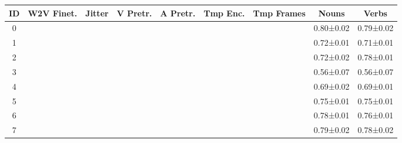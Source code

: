 \begin{tabular}{ccccccccc}
	\toprule
	ID & W2V Finet. &     Jitter &   V Pretr. &   A Pretr. &   Tmp Enc. & Tmp 
	Frames &     Nouns &     Verbs \\
	\midrule
	0 & \checkmark & \checkmark & \checkmark & \checkmark & \checkmark & 
	\checkmark & 0.80±0.02 & 0.79±0.02 \\
	1 &            & \checkmark & \checkmark & \checkmark & \checkmark & 
	\checkmark & 0.72±0.01 & 0.71±0.01 \\
	2 & \checkmark &            & \checkmark & \checkmark & \checkmark & 
	\checkmark & 0.72±0.02 & 0.78±0.01 \\
	3 & \checkmark & \checkmark &            &            & \checkmark & 
	\checkmark & 0.56±0.07 & 0.56±0.07 \\
	4 & \checkmark & \checkmark & \checkmark &            & \checkmark & 
	\checkmark & 0.69±0.02 & 0.69±0.01 \\
	5 & \checkmark & \checkmark &            & \checkmark & \checkmark & 
	\checkmark & 0.75±0.01 & 0.75±0.01 \\
	6 & \checkmark & \checkmark &            & \checkmark &            & 
	\checkmark & 0.78±0.01 & 0.76±0.01 \\
	7 & \checkmark & \checkmark & \checkmark & \checkmark & \checkmark 
	&            & 0.79±0.02 & 0.78±0.02 \\
	\bottomrule
\end{tabular}
